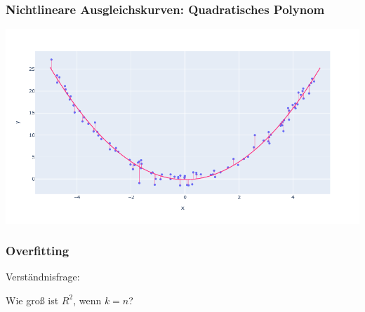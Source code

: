 \begin{frame}
\frametitle{Nichtlineare Ausgleichskurven: Quadratisches Polynom}

\begin{center}
\includegraphics[width=\textwidth]{fig7/squared-fit.png}
\end{center}

\end{frame}


\begin{frame}
\frametitle{Overfitting}

\vfill
\begin{center}
Verständnisfrage:
\vspace{1mm}

{\Large Wie groß ist $R^2$, wenn $k = n$?}
\end{center}
\vfill

\end{frame}



